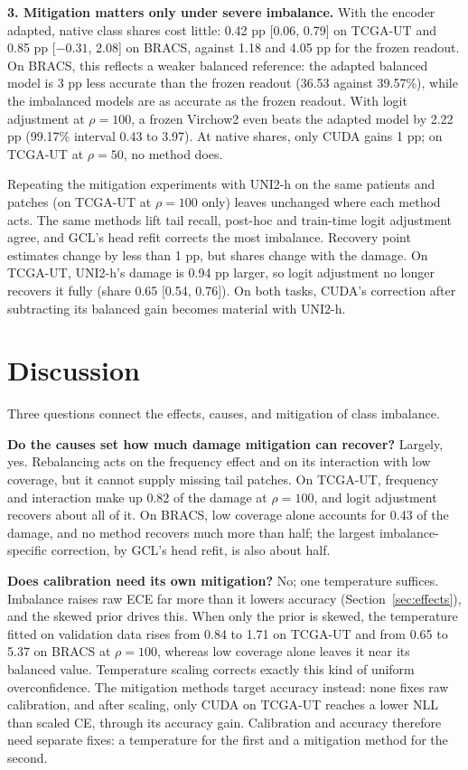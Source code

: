 \documentclass[11pt]{article}
\begin{document}
\smallskip\noindent\textbf{3. Mitigation matters only under severe imbalance.}
With the encoder adapted, native class shares cost little: 0.42 pp [0.06, 0.79] on TCGA-UT and 0.85 pp [$-0.31$, 2.08] on BRACS, against 1.18 and 4.05 pp for the frozen readout. On BRACS, this reflects a weaker balanced reference: the adapted balanced model is 3 pp less accurate than the frozen readout (36.53 against 39.57\%), while the imbalanced models are as accurate as the frozen readout. With logit adjustment at $\rho=100$, a frozen Virchow2 even beats the adapted model by 2.22 pp (99.17\% interval 0.43 to 3.97). At native shares, only CUDA gains 1 pp; on TCGA-UT at $\rho=50$, no method does.

\medskip\noindent Repeating the mitigation experiments with UNI2-h on the same patients and patches (on TCGA-UT at $\rho=100$ only) leaves unchanged where each method acts. The same methods lift tail recall, post-hoc and train-time logit adjustment agree, and GCL's head refit corrects the most imbalance. Recovery point estimates change by less than 1 pp, but shares change with the damage. On TCGA-UT, UNI2-h's damage is 0.94 pp larger, so logit adjustment no longer recovers it fully (share 0.65 [0.54, 0.76]). On both tasks, CUDA's correction after subtracting its balanced gain becomes material with UNI2-h.

\section{Discussion}
\label{sec:discussion}
Three questions connect the effects, causes, and mitigation of class imbalance.

\smallskip\noindent\textbf{Do the causes set how much damage mitigation can recover?}
Largely, yes. Rebalancing acts on the frequency effect and on its interaction with low coverage, but it cannot supply missing tail patches. On TCGA-UT, frequency and interaction make up 0.82 of the damage at $\rho=100$, and logit adjustment recovers about all of it. On BRACS, low coverage alone accounts for 0.43 of the damage, and no method recovers much more than half; the largest imbalance-specific correction, by GCL's head refit, is also about half.

\smallskip\noindent\textbf{Does calibration need its own mitigation?}
No; one temperature suffices. Imbalance raises raw ECE far more than it lowers accuracy (Section~\ref{sec:effects}), and the skewed prior drives this. When only the prior is skewed, the temperature fitted on validation data rises from 0.84 to 1.71 on TCGA-UT and from 0.65 to 5.37 on BRACS at $\rho=100$, whereas low coverage alone leaves it near its balanced value. Temperature scaling corrects exactly this kind of uniform overconfidence. The mitigation methods target accuracy instead: none fixes raw calibration, and after scaling, only CUDA on TCGA-UT reaches a lower NLL than scaled CE, through its accuracy gain. Calibration and accuracy therefore need separate fixes: a temperature for the first and a mitigation method for the second.
\end{document}

